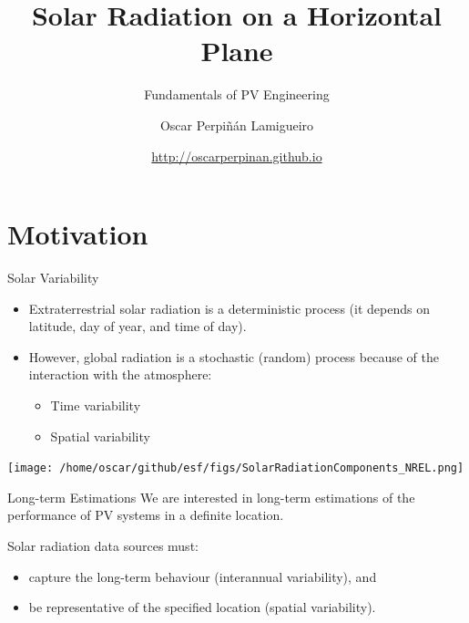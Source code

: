 \documentclass[xcolor={usenames,svgnames,dvipsnames}]{beamer}
\author{Oscar Perpiñán Lamigueiro}
\date{\url{http://oscarperpinan.github.io}}
\title{Solar Radiation on a Horizontal Plane}
\subtitle{Fundamentals of PV Engineering}
\begin{document}
\maketitle

\section{Motivation}
\label{sec:orgdcde097}
\begin{frame}[label={sec:org177e7ac}]{Solar Variability}
\begin{itemize}
\item \alert{Extraterrestrial} solar radiation is a \alert{deterministic process} (it depends on latitude, day of year, and time of day).
\item However, \alert{global radiation} is a \alert{stochastic (random) process} because of the interaction with the atmosphere:
\begin{itemize}
\item Time variability
\item Spatial variability
\end{itemize}
\end{itemize}

\begin{center}
\texttt{[image: /home/oscar/github/esf/figs/SolarRadiationComponents\_NREL.png]}
\end{center}
\end{frame}

\begin{frame}[label={sec:orgcf26303}]{Long-term Estimations}
We are interested in \alert{long-term estimations} of the performance of PV systems in a definite location.

Solar radiation data sources must:
\begin{itemize}
\item \alert{capture the long-term behaviour} (interannual variability), and
\item be \alert{representative of the specified location} (spatial variability).
\end{itemize}
\end{frame}
\end{document}
